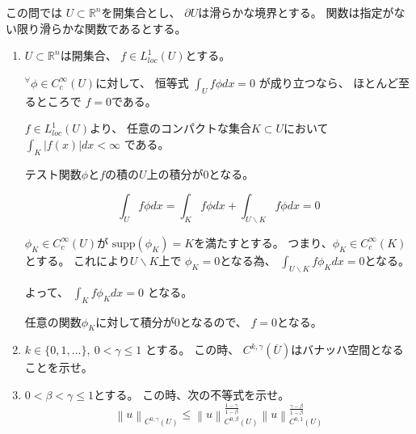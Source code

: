 \documentclass[12pt,b5paper]{ltjsarticle}
\begin{document}
\hrulefill
\newpage
\hrulefill


この問では
$U\subset \mathbb{R}^{n}$を開集合とし、
$\partial U$は滑らかな境界とする。
関数は指定がない限り滑らかな関数であるとする。

\begin{enumerate}
 \item
      $U \subset \mathbb{R}^{n}$は開集合、
      $f\in L^{1}_{loc}(U)$とする。

      ${}^{\forall}\phi \in C^{\infty}_{c}(U)$に対して、
      恒等式
      $\int_{U}f\phi dx =0$
      が成り立つなら、
      ほとんど至るところで
      $f=0$である。

      \dotfill

      $f\in L^{1}_{loc}(U)$より、
      任意のコンパクトな集合$K \subset U$において
      $\int_{K}\lvert f(x) \rvert dx < \infty$
      である。

      テスト関数$\phi$と$f$の積の$U$上の積分が$0$となる。

      \begin{equation}
       \int_{U}f\phi dx
        =
        \int_{K}f\phi dx
        + \int_{U\backslash K}f\phi dx =0
      \end{equation}

      $\phi_{K}\in C^{\infty}_{c}(U)$が
      $\mathrm{supp}(\phi_{K})=K$を満たすとする。
      つまり、$\phi_{K}\in C^{\infty}_{c}(K)$とする。
      これにより$U\backslash K$上で $\phi_{K}=0$となる為、
      $\int_{U\backslash K}f\phi_{K} dx =0$となる。

      よって、
      $\int_{K}f\phi_{K} dx=0$
      となる。

      任意の関数$\phi_{K}$に対して積分が0となるので、
      $f=0$となる。

      

      \hrulefill
 \item
      $k\in \{ 0,1,\dots \},\: 0< \gamma \leq 1$
      とする。
      この時、
      $C^{k,\gamma}(\overline{U})$はバナッハ空間となることを示せ。

      \dotfill


      \hrulefill
 \item
      $0 < \beta < \gamma \leq 1$とする。
      この時、次の不等式を示せ。
      \begin{equation}
       \left\| u \right\|_{C^{0,\gamma}(U)}
        \leq
        \left\| u \right\|_{C^{0,\beta}(U)}^{\frac{1-\gamma}{1-\beta}}
        \left\| u \right\|_{C^{0,1}(U)}^{\frac{\gamma-\beta}{1-\beta}}
      \end{equation}
      

\end{enumerate}
\end{document}
